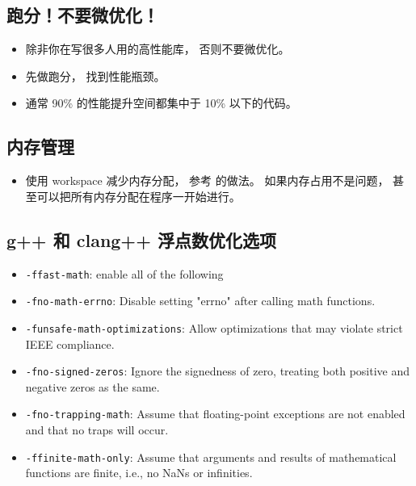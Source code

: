 
\begin{issues}
\issueDraft
\end{issues}


\subsection{跑分！不要微优化！}
\begin{itemize}
\item 除非你在写很多人用的高性能库， 否则不要微优化。
\item 先做跑分， 找到性能瓶颈。
\item 通常 90\% 的性能提升空间都集中于 10\% 以下的代码。
\end{itemize}


\subsection{内存管理}
\begin{itemize}
\item 使用 workspace 减少内存分配， 参考 的做法。 如果内存占用不是问题， 甚至可以把所有内存分配在程序一开始进行。
\end{itemize}

\subsection{g++ 和 clang++ 浮点数优化选项}
\begin{itemize}
\item \verb|-ffast-math|: enable all of the following
\item \verb|-fno-math-errno|: Disable setting "errno" after calling math functions.
\item \verb|-funsafe-math-optimizations|: Allow optimizations that may violate strict IEEE compliance.
\item \verb|-fno-signed-zeros|: Ignore the signedness of zero, treating both positive and negative zeros as the same.
\item \verb|-fno-trapping-math|: Assume that floating-point exceptions are not enabled and that no traps will occur.
\item \verb|-ffinite-math-only|: Assume that arguments and results of mathematical functions are finite, i.e., no NaNs or infinities.
\end{itemize}
